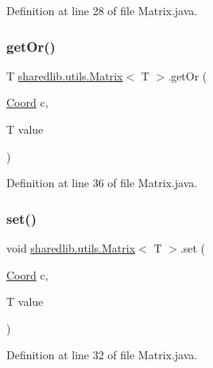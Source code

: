 Definition at line 28 of file Matrix.\+java.

\hypertarget{classsharedlib_1_1utils_1_1_matrix_aca6a0e8ec5f4340706185ad79e1811df}{}\label{classsharedlib_1_1utils_1_1_matrix_aca6a0e8ec5f4340706185ad79e1811df} 
\subsubsection{\texorpdfstring{get\+Or()}{getOr()}}
{\footnotesize\ttfamily T \hyperlink{classsharedlib_1_1utils_1_1_matrix}{sharedlib.\+utils.\+Matrix}$<$ T $>$.get\+Or (\begin{DoxyParamCaption}\item[{\hyperlink{classsharedlib_1_1utils_1_1_coord}{Coord}}]{c,  }\item[{T}]{value }\end{DoxyParamCaption})}



Definition at line 36 of file Matrix.\+java.

\hypertarget{classsharedlib_1_1utils_1_1_matrix_a7d0d0c02287d913332a739cbcdddde7e}{}\label{classsharedlib_1_1utils_1_1_matrix_a7d0d0c02287d913332a739cbcdddde7e} 
\subsubsection{\texorpdfstring{set()}{set()}}
{\footnotesize\ttfamily void \hyperlink{classsharedlib_1_1utils_1_1_matrix}{sharedlib.\+utils.\+Matrix}$<$ T $>$.set (\begin{DoxyParamCaption}\item[{\hyperlink{classsharedlib_1_1utils_1_1_coord}{Coord}}]{c,  }\item[{T}]{value }\end{DoxyParamCaption})}



Definition at line 32 of file Matrix.\+java.

\hypertarget{classsharedlib_1_1utils_1_1_matrix_a19d3681f811fe3d54e926985b1e02ff4}{}\label{classsharedlib_1_1utils_1_1_matrix_a19d3681f811fe3d54e926985b1e02ff4} 
